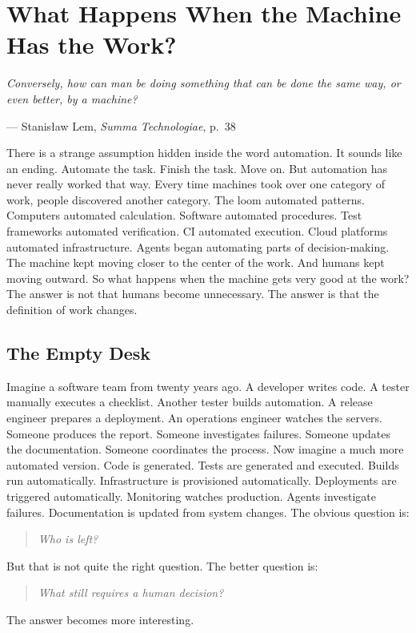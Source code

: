 \documentclass[11pt,twoside]{book}
\providecommand{\epigraphlem}[2]{%
  \begin{flushright}\begin{minipage}{0.72\textwidth}\raggedleft
  \itshape #1\par\vspace{0.4em}\normalfont\small --- #2
  \end{minipage}\end{flushright}\vspace{1.2em}}
\begin{document}
\chapter{What Happens When the Machine Has the Work?}

\epigraphlem{Conversely, how can man be doing something that can be done the same way, or even better, by a machine?}{Stanisław Lem, \textit{Summa Technologiae}, p.~38}


There is a strange assumption hidden inside the word automation.
It sounds like an ending.
Automate the task.
Finish the task.
Move on.
But automation has never really worked that way.
Every time machines took over one category of work, people discovered another category.
The loom automated patterns.
Computers automated calculation.
Software automated procedures.
Test frameworks automated verification.
CI automated execution.
Cloud platforms automated infrastructure.
Agents began automating parts of decision-making.
The machine kept moving closer to the center of the work.
And humans kept moving outward.
So what happens when the machine gets very good at the work?
The answer is not that humans become unnecessary.
The answer is that the definition of work changes.

\section*{The Empty Desk}

Imagine a software team from twenty years ago.
A developer writes code.
A tester manually executes a checklist.
Another tester builds automation.
A release engineer prepares a deployment.
An operations engineer watches the servers.
Someone produces the report.
Someone investigates failures.
Someone updates the documentation.
Someone coordinates the process.
Now imagine a much more automated version.
Code is generated.
Tests are generated and executed.
Builds run automatically.
Infrastructure is provisioned automatically.
Deployments are triggered automatically.
Monitoring watches production.
Agents investigate failures.
Documentation is updated from system changes.
The obvious question is:
\begin{quote}
\emph{Who is left?}
\end{quote}
But that is not quite the right question.
The better question is:
\begin{quote}
\emph{What still requires a human decision?}
\end{quote}
The answer becomes more interesting.
\end{document}
